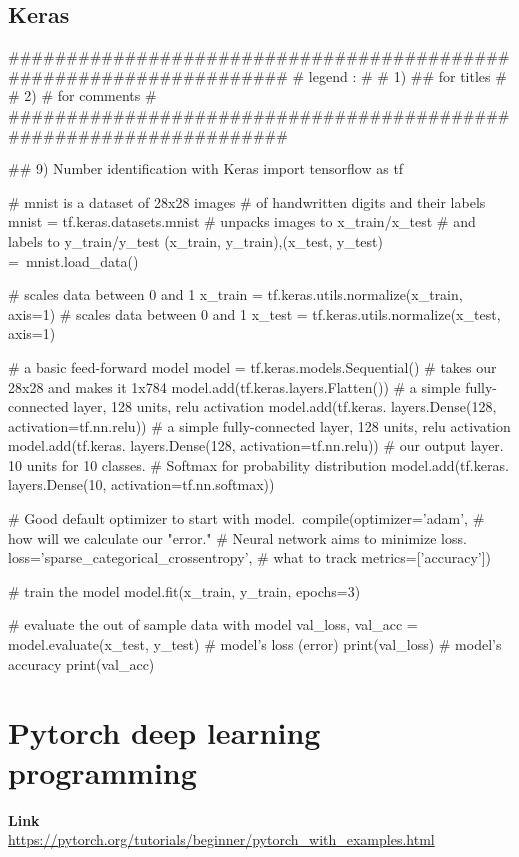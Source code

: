 \documentclass[11pt]{article}
\begin{document}
\subsection{Keras}
\begin{python}
###################################################################
# legend :                                                        #
#         1) ## for titles                                        #
#         2) #  for comments                                      #
###################################################################   

## 9) Number identification with Keras
import tensorflow as tf

# mnist is a dataset of 28x28 images
# of handwritten digits and their labels
mnist = tf.keras.datasets.mnist
# unpacks images to x_train/x_test
# and labels to y_train/y_test
(x_train, y_train),(x_test, y_test) =\
    mnist.load_data()

# scales data between 0 and 1
x_train = tf.keras.utils.normalize(x_train, axis=1)
# scales data between 0 and 1
x_test = tf.keras.utils.normalize(x_test, axis=1)

# a basic feed-forward model
model = tf.keras.models.Sequential()
# takes our 28x28 and makes it 1x784
model.add(tf.keras.layers.Flatten())
# a simple fully-connected layer, 128 units, relu activation
model.add(tf.keras.
          layers.Dense(128, activation=tf.nn.relu))
# a simple fully-connected layer, 128 units, relu activation
model.add(tf.keras.
          layers.Dense(128, activation=tf.nn.relu))
# our output layer. 10 units for 10 classes.
# Softmax for probability distribution
model.add(tf.keras.
          layers.Dense(10, activation=tf.nn.softmax))

# Good default optimizer to start with
model.\
    compile(optimizer='adam',
# how will we calculate our "error."
            # Neural network aims to minimize loss.
              loss='sparse_categorical_crossentropy',
# what to track
              metrics=['accuracy'])

# train the model
model.fit(x_train, y_train, epochs=3)

# evaluate the out of sample data with model
val_loss, val_acc = model.evaluate(x_test, y_test)
# model's loss (error)
print(val_loss)
# model's accuracy
print(val_acc)
\end{python}{}
\clearpage
\section{Pytorch deep learning programming}
\textbf{Link}\\
\url{https://pytorch.org/tutorials/beginner/pytorch_with_examples.html}
\end{document}
